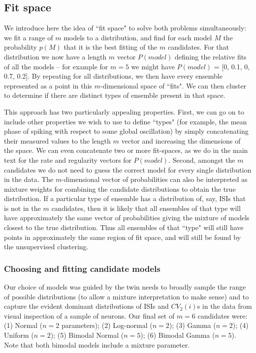 \documentclass[11pt,a4paper]{article}
\begin{document}
\subsection{Fit space}
We introduce here the idea of ``fit space" to solve both problems simultaneously: we fit a range of $m$ models to a distribution, and find for each model $M$ the probability $p(M)$ that it is the best fitting of the $m$ candidates. For that distribution we now have a length $m$ vector $P(model)$ defining the relative fits of all the models -- for example for $m=5$ we might have $P(model)$ = [0, 0.1, 0, 0.7, 0.2]. By repeating for all distributions, we then have every ensemble represented as a point in this $m$-dimensional space of ``fits". We can then cluster to determine if there are distinct types of ensemble present in that space.

This approach has two particularly appealing properties. First, we can go on to include other properties we wish to use to define ``types" (for example, the mean phase of spiking with respect to some global oscillation) by simply concatenating their measured values to the length $m$ vector and increasing the dimensions of the space. We can even concatenate two or more fit-spaces, as we do in the main text for the rate and regularity vectors for $P(model)$. Second, amongst the $m$ candidates we do not need to guess the correct model for every single distribution in the data. The $m$-dimensional vector of probabilities can also be interpreted as mixture weights for combining the candidate distributions to obtain the true distribution. If a particular type of ensemble has a distribution of, say, ISIs that is not in the $m$ candidates, then it is likely that all ensembles of that type will have approximately the same vector of probabilities giving the mixture of models closest to the true distribution. Thus all ensembles of that ``type" will still have points in approximately the same region of fit space, and will still be found by the unsupervised clustering.

\subsubsection{Choosing and fitting candidate models}
Our choice of models was guided by the twin needs to broadly sample the range of possible distributions (to allow a mixture interpretation to make sense) and to capture the evident dominant distributions of ISIs and $CV_2(i)$s in the data from visual inspection of a sample of neurons. Our final set of $m = 6$ candidates were:
(1) Normal ($n=2$ parameters); (2) Log-normal ($n=2$); (3) Gamma ($n=2$); (4) Uniform ($n=2$); (5) Bimodal Normal ($n=5$); (6) Bimodal Gamma ($n=5$). Note that both bimodal models include a mixture parameter.
\end{document}
